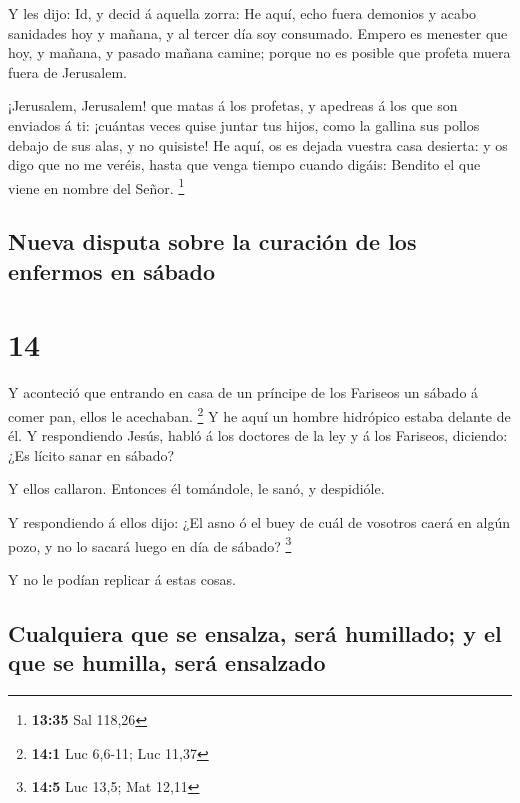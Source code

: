  Y les dijo: Id, y decid á aquella zorra: He aquí, echo
fuera demonios y acabo sanidades hoy y mañana, y al tercer día soy
consumado.  Empero es menester que hoy, y mañana, y
pasado mañana camine; porque no es posible que profeta muera fuera de
Jerusalem.

 ¡Jerusalem, Jerusalem! que matas á los profetas, y
apedreas á los que son enviados á ti: ¡cuántas veces quise juntar tus
hijos, como la gallina sus pollos debajo de sus alas, y no quisiste!
 He aquí, os es dejada vuestra casa desierta: y os digo
que no me veréis, hasta que venga tiempo cuando digáis: Bendito el que
viene en nombre del Señor. \footnote{\textbf{13:35} Sal 118,26}

\hypertarget{nueva-disputa-sobre-la-curaciuxf3n-de-los-enfermos-en-suxe1bado}{%
\subsection{Nueva disputa sobre la curación de los enfermos en
sábado}\label{nueva-disputa-sobre-la-curaciuxf3n-de-los-enfermos-en-suxe1bado}}

\hypertarget{section-13}{%
\section{14}\label{section-13}}

 Y aconteció que entrando en casa de un príncipe de los
Fariseos un sábado á comer pan, ellos le acechaban. \footnote{\textbf{14:1}
  Luc 6,6-11; Luc 11,37}  Y he aquí un hombre hidrópico
estaba delante de él.  Y respondiendo Jesús, habló á los
doctores de la ley y á los Fariseos, diciendo: ¿Es lícito sanar en
sábado?

 Y ellos callaron. Entonces él tomándole, le sanó, y
despidióle.

 Y respondiendo á ellos dijo: ¿El asno ó el buey de cuál
de vosotros caerá en algún pozo, y no lo sacará luego en día de sábado?
\footnote{\textbf{14:5} Luc 13,5; Mat 12,11}

 Y no le podían replicar á estas cosas.

\hypertarget{cualquiera-que-se-ensalza-seruxe1-humillado-y-el-que-se-humilla-seruxe1-ensalzado}{%
\subsection{Cualquiera que se ensalza, será humillado; y el que se
humilla, será
ensalzado}\label{cualquiera-que-se-ensalza-seruxe1-humillado-y-el-que-se-humilla-seruxe1-ensalzado}}


